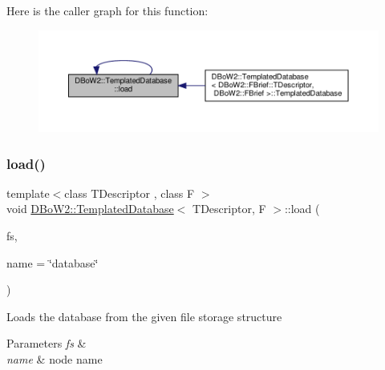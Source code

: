 Here is the caller graph for this function\+:\nopagebreak
\begin{figure}[H]
\begin{center}
\leavevmode
\includegraphics[width=350pt]{classDBoW2_1_1TemplatedDatabase_aff1528af5cff047539eb1e2c75fb6345_icgraph}
\end{center}
\end{figure}
\mbox{\label{classDBoW2_1_1TemplatedDatabase_a9aef0b11da757aba5f07deb2f5b66097}} 
\subsubsection{\texorpdfstring{load()}{load()}\hspace{0.1cm}{\footnotesize\ttfamily [2/2]}}
{\footnotesize\ttfamily template$<$class T\+Descriptor , class F $>$ \\
void \hyperlink{classDBoW2_1_1TemplatedDatabase}{D\+Bo\+W2\+::\+Templated\+Database}$<$ T\+Descriptor, F $>$\+::load (\begin{DoxyParamCaption}\item[{const cv\+::\+File\+Storage \&}]{fs,  }\item[{const std\+::string \&}]{name = {\ttfamily \char`\"{}database\char`\"{}} }\end{DoxyParamCaption})\hspace{0.3cm}{\ttfamily [virtual]}}

Loads the database from the given file storage structure 
\begin{DoxyParams}{Parameters}
{\em fs} & \\
\hline
{\em name} & node name \\
\hline
\end{DoxyParams}
\mbox{\label{classDBoW2_1_1TemplatedDatabase_a654d8d3c7f80172be1e091663e47535d}} 

